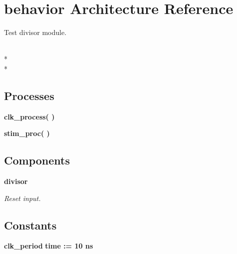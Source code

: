 \section{behavior Architecture Reference}
\label{classtest_divisor_1_1behavior}


Test divisor module.  


\\*
\\*
\subsection*{Processes}
 \begin{DoxyCompactItemize}
\item 
{\bf clk\-\_\-process}{\bfseries  (  )}\label{classtest_divisor_1_1behavior_ac5bb218131b813f7908ec89476b31fca}

\item 
{\bf stim\-\_\-proc}{\bfseries  (  )}\label{classtest_divisor_1_1behavior_ad2efa6785cff833c341e27596b21aeb5}

\end{DoxyCompactItemize}
\subsection*{Components}
 \begin{DoxyCompactItemize}
\item 
{\bf divisor}  {\bfseries }  
\begin{DoxyCompactList}\small\item\em Reset input. \end{DoxyCompactList}\end{DoxyCompactItemize}
\subsection*{Constants}
 \begin{DoxyCompactItemize}
\item 
{\bf clk\-\_\-period} {\bfseries time  \-:=  10  ns } \label{classtest_divisor_1_1behavior_aee75ea6d5c1621041dff5db20cba7e70}

\end{DoxyCompactItemize}
